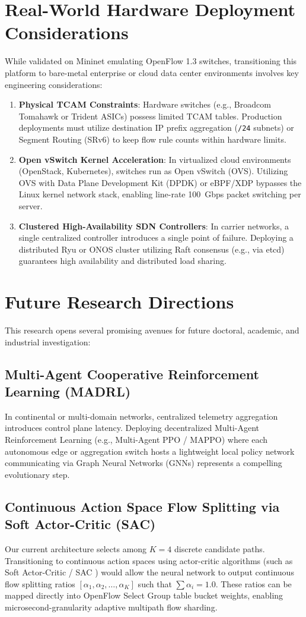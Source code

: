 \section{Real-World Hardware Deployment Considerations}
While validated on Mininet emulating OpenFlow 1.3 switches, transitioning this platform to bare-metal enterprise or cloud data center environments involves key engineering considerations:
\begin{enumerate}
    \item \textbf{Physical TCAM Constraints}: Hardware switches (e.g., Broadcom Tomahawk or Trident ASICs) possess limited TCAM tables. Production deployments must utilize destination IP prefix aggregation (\texttt{/24} subnets) or Segment Routing (SRv6) to keep flow rule counts within hardware limits.
    \item \textbf{Open vSwitch Kernel Acceleration}: In virtualized cloud environments (OpenStack, Kubernetes), switches run as Open vSwitch (OVS). Utilizing OVS with Data Plane Development Kit (DPDK) or eBPF/XDP bypasses the Linux kernel network stack, enabling line-rate 100~Gbps packet switching per server.
    \item \textbf{Clustered High-Availability SDN Controllers}: In carrier networks, a single centralized controller introduces a single point of failure. Deploying a distributed Ryu or ONOS cluster utilizing Raft consensus (e.g., via etcd) guarantees high availability and distributed load sharing.
\end{enumerate}

\section{Future Research Directions}
This research opens several promising avenues for future doctoral, academic, and industrial investigation:

\subsection{Multi-Agent Cooperative Reinforcement Learning (MADRL)}
In continental or multi-domain networks, centralized telemetry aggregation introduces control plane latency. Deploying decentralized Multi-Agent Reinforcement Learning (e.g., Multi-Agent PPO / MAPPO) where each autonomous edge or aggregation switch hosts a lightweight local policy network communicating via Graph Neural Networks (GNNs) represents a compelling evolutionary step.

\subsection{Continuous Action Space Flow Splitting via Soft Actor-Critic (SAC)}
Our current architecture selects among $K=4$ discrete candidate paths. Transitioning to continuous action spaces using actor-critic algorithms (such as Soft Actor-Critic / SAC \cite{lillicrap2015continuous}) would allow the neural network to output continuous flow splitting ratios $[\alpha_1, \alpha_2, \dots, \alpha_K]$ such that $\sum \alpha_i = 1.0$. These ratios can be mapped directly into OpenFlow Select Group table bucket weights, enabling microsecond-granularity adaptive multipath flow sharding.

